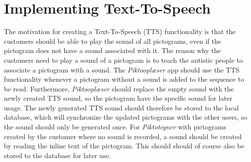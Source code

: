 \section{Implementing Text-To-Speech}
The motivation for creating a Text-To-Speech (TTS) functionality is that the customers should be able to play the sound of all pictograms, even if the pictogram does not have a sound associated with it.
The reason why the customers need to play a sound of a pictogram is to teach the autistic people to associate a pictogram with a sound.
The \textit{Piktooplæser} app should use the TTS functionality whenever a pictogram without a sound is added to the sequence to be read.
Furthermore, \textit{Piktooplæser} should replace the empty sound with the newly created TTS sound, so the pictogram have the specific sound for later usage. The newly generated TTS sound should therefore be stored to the local database, which will synchronize the updated pictograms with the other users, so the sound should only be generated once.
For \textit{Piktotegner} with pictograms created by the customer where no sound is recorded, a sound should be created by reading the inline text of the pictogram. This should should of course also be stored to the database for later use.